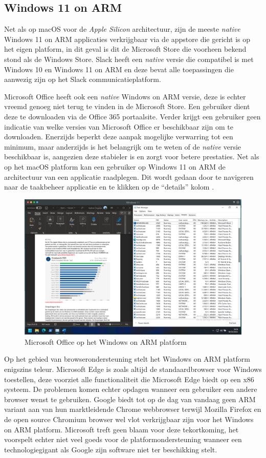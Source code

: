 \subsection{Windows 11 on ARM}
Net als op macOS voor de \textit{Apple Silicon} architectuur, zijn de meeste \textit{native} Windows 11 on ARM applicaties verkrijgbaar via de appstore die gericht is op het eigen platform, in dit geval is dit de Microsoft Store die voorheen bekend stond als de Windows Store. Slack heeft een \textit{native} versie die compatibel is met Windows 10 en Windows 11 on ARM en deze bevat alle toepassingen die aanwezig zijn op het Slack communicatieplatform.

Microsoft Office heeft ook een \textit{native} Windows on ARM versie, deze is echter vreemd genoeg niet terug te vinden in de Microsoft Store. Een gebruiker dient deze te downloaden via de Office 365 portaalsite. Verder krijgt een gebruiker geen indicatie van welke versies van Microsoft Office er beschikbaar zijn om te downloaden. Enerzijds beperkt deze aanpak mogelijke verwarring tot een minimum, maar anderzijds is het belangrijk om te weten of de \textit{native} versie beschikbaar is, aangezien deze stabieler is en zorgt voor betere prestaties. Net als op het macOS platform kan een gebruiker op Windows 11 on ARM de architectuur van een applicatie raadplegen. Dit wordt gedaan door te navigeren naar de taakbeheer applicatie en te klikken op de “details” kolom \autocite{Venkat2020}.

\begin{figure}[!h]
	\centering
	\includegraphics[width=\linewidth]{img/office_winARM.png}
	\caption{Microsoft Office op het Windows on ARM platform}
\end{figure}

Op het gebied van browserondersteuning stelt het Windows on ARM platform enigszins teleur. Microsoft Edge is zoals altijd de standaardbrowser voor Windows toestellen, deze voorziet alle functionaliteit die Microsoft Edge biedt op een x86 systeem. De problemen komen echter opdagen wanneer een gebruiker een andere browser wenst te gebruiken. Google biedt tot op de dag van vandaag geen ARM variant aan van hun marktleidende Chrome webbrowser terwijl Mozilla Firefox en de open source Chromium browser wel vlot verkrijgbaar zijn voor het Windows on ARM platform. Microsoft treft geen blaam voor deze tekortkoming, het voorspelt echter niet veel goeds voor de platformondersteuning wanneer een technologiegigant als Google zijn software niet ter beschikking stelt.

